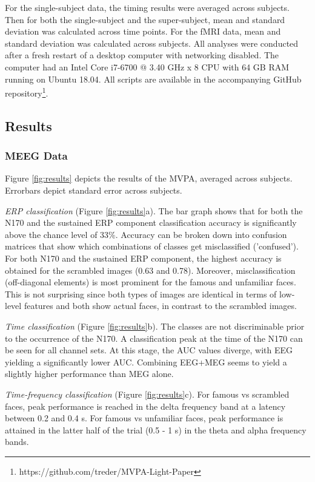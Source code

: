 \documentclass[utf8]{frontiersSCNS} %
\begin{document}
For the single-subject data, the timing results were averaged across subjects. Then for both the single-subject and the super-subject, mean and standard deviation was calculated across time points. For the fMRI data, mean and standard deviation was calculated across subjects. All analyses were conducted after a fresh restart of a desktop computer with networking disabled. The computer had an Intel Core i7-6700 @ 3.40 GHz x 8 CPU with 64 GB RAM running on Ubuntu 18.04. All scripts are available in the accompanying GitHub repository\footnote{https://github.com/treder/MVPA-Light-Paper}.

\subsection{Results}

\subsubsection{MEEG Data}
Figure \ref{fig:results} depicts the results of the MVPA, averaged across subjects. Errorbars depict standard error across subjects.

\textit{ERP classification} (Figure \ref{fig:results}a). The bar graph shows that for both the N170 and the sustained ERP component classification accuracy is significantly above the chance level of 33\%. Accuracy can be broken down into confusion matrices that show which combinations of classes get misclassified ('confused'). For both N170 and the sustained ERP component, the highest accuracy is obtained for the scrambled images (0.63 and 0.78). Moreover,  misclassification (off-diagonal elements) is most prominent for the famous and unfamiliar faces. This is not surprising since both types of images are identical in terms of low-level features and both show actual faces, in contrast to the scrambled images.

\textit{Time classification} (Figure \ref{fig:results}b). The classes are not discriminable prior to the occurrence of the N170. A classification peak at the time of the N170 can be seen for all channel sets. At this stage, the AUC values diverge, with EEG yielding a significantly lower AUC. Combining EEG+MEG seems to yield a slightly higher performance than MEG alone.

\textit{Time-frequency classification} (Figure \ref{fig:results}c). For famous vs scrambled faces, peak performance is reached in the delta frequency band at a latency between 0.2 and 0.4 s. For famous vs unfamiliar faces, peak performance is attained in the latter half of the trial (0.5 - 1 s) in the theta and alpha frequency bands.
\end{document}
